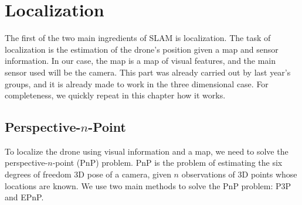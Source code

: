 \chapter{Localization} %
The first of the two main ingredients of SLAM is localization. The task of localization is the estimation of the drone's position given a map and sensor information. In our case, the map is a map of visual features, and the main sensor used will be the camera. This part was already carried out by last year's groups, and it is already made to work in the three dimensional case. For completeness, we quickly repeat in this chapter how it works.

\section{Perspective-$n$-Point}\label{sec:pnp}
To localize the drone using visual information and a map, we need to solve the perspective-$n$-point (PnP) problem. PnP is the problem of estimating the six degrees of freedom 3D pose of a camera, given $n$ observations of 3D points whose locations are known. We use two main methods to solve the PnP problem: P3P and EPnP.


